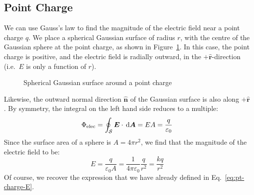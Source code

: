 \subsection{Point Charge}
We can use Gauss's law to find the magnitude of the electric field near a
point charge $q$. We place a spherical Gaussian surface of radius $r$, with the
centre of the Gaussian sphere at the point charge, as shown in
Figure~\ref{fig:pt-charge-gaussian}. In this case, the point charge is positive,
and the electric field is radially outward, in the $+\hat{\bm r}$-direction
(i.e.\ $E$ is only a function of $r$).
\begin{figure}[ht]
  \centering
  \caption{Spherical Gaussian surface around a point charge}
  \label{fig:pt-charge-gaussian}
\end{figure}
Likewise, the outward normal direction $\hat{\bm n}$ of the Gaussian surface is
also along $+\hat{\bm r}$. By symmetry, the integral on the left hand side
reduces to a multiple:
\begin{equation*}
  \Phi_\text{elec}=\oint_{\mathcal S}\bm E\cdot\dl{\bm A}=EA=\frac q{\varepsilon_0}
\end{equation*}
Since the surface area of a sphere is $A=4\pi r^2$, we find that the magnitude
of the electric field to be:
\begin{equation*}
  E=\frac q{\varepsilon_0A}=\frac1{4\pi\varepsilon_0}\frac q{r^2}=\frac{kq}{r^2}
\end{equation*}
Of course, we recover the expression that we have already defined in
Eq.~\ref{eq:pt-charge-E}.




